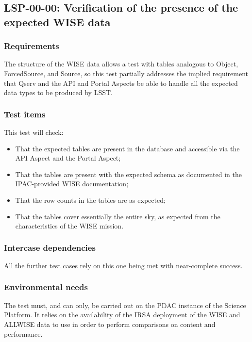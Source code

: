 \subsection{LSP-00-00: Verification of the presence of the expected WISE data}
\label{lsp-00-00}

\subsubsection{Requirements}

The structure of the WISE data allows a test with tables analogous to Object, ForcedSource, and Source, 
so this test partially addresses the implied requirement that Qserv and the API and Portal Aspects be able to handle all the expected data types to be produced by LSST.

\subsubsection{Test items}

This test will check:

\begin{itemize}

  \item{That the expected tables are present in the database and accessible via the API Aspect and the Portal Aspect;}
  \item{That the tables are present with the expected schema as documented in the IPAC-provided WISE documentation;}
  \item{That the row counts in the tables are as expected;}
  \item{That the tables cover essentially the entire sky, as expected from the characteristics of the WISE mission.}

\end{itemize}

\subsubsection{Intercase dependencies}

All the further test cases rely on this one being met with near-complete success.

\subsubsection{Environmental needs}

The test must, and can only, be carried out on the PDAC instance of the Science Platform.
It relies on the availability of the IRSA deployment of the WISE and ALLWISE data to use in order to perform comparisons on content and performance.

